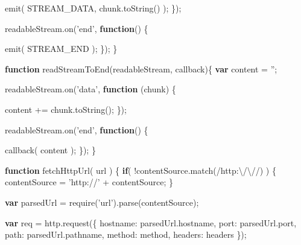 \documentclass[12pt, ]{article}
\newenvironment{Shaded}{}{}
\newcommand{\KeywordTok}[1]{\textcolor[rgb]{0.00,0.44,0.13}{\textbf{{#1}}}}
\newcommand{\DataTypeTok}[1]{\textcolor[rgb]{0.56,0.13,0.00}{{#1}}}
\newcommand{\FloatTok}[1]{\textcolor[rgb]{0.25,0.63,0.44}{{#1}}}
\newcommand{\StringTok}[1]{\textcolor[rgb]{0.25,0.44,0.63}{{#1}}}
\newcommand{\OtherTok}[1]{\textcolor[rgb]{0.00,0.44,0.13}{{#1}}}
\newcommand{\FunctionTok}[1]{\textcolor[rgb]{0.02,0.16,0.49}{{#1}}}
\newcommand{\NormalTok}[1]{{#1}}
\begin{document}
\begin{Shaded}
\begin{Highlighting}[]
         \FunctionTok{emit}\NormalTok{( STREAM_DATA, }\OtherTok{chunk}\NormalTok{.}\FunctionTok{toString}\NormalTok{() );}
      \NormalTok{\});}
      
      \OtherTok{readableStream}\NormalTok{.}\FunctionTok{on}\NormalTok{(}\StringTok{'end'}\NormalTok{, }\KeywordTok{function}\NormalTok{() \{}
               
         \FunctionTok{emit}\NormalTok{( STREAM_END );}
      \NormalTok{\});}
   \NormalTok{\}}
   
   \KeywordTok{function} \FunctionTok{readStreamToEnd}\NormalTok{(readableStream, callback)\{}
      \KeywordTok{var} \NormalTok{content = }\StringTok{''}\NormalTok{;}
   
      \OtherTok{readableStream}\NormalTok{.}\FunctionTok{on}\NormalTok{(}\StringTok{'data'}\NormalTok{, }\KeywordTok{function} \NormalTok{(chunk) \{}
                                             
         \NormalTok{content += }\OtherTok{chunk}\NormalTok{.}\FunctionTok{toString}\NormalTok{();}
      \NormalTok{\});}
      
      \OtherTok{readableStream}\NormalTok{.}\FunctionTok{on}\NormalTok{(}\StringTok{'end'}\NormalTok{, }\KeywordTok{function}\NormalTok{() \{}
               
         \FunctionTok{callback}\NormalTok{( content );}
      \NormalTok{\});}
   \NormalTok{\}}
   
   \KeywordTok{function} \FunctionTok{fetchHttpUrl}\NormalTok{( url ) \{}
      \KeywordTok{if}\NormalTok{( !}\OtherTok{contentSource}\NormalTok{.}\FunctionTok{match}\NormalTok{(}\OtherTok{/http:}\FloatTok{\textbackslash{}/\textbackslash{}/}\OtherTok{/}\NormalTok{) ) \{}
         \NormalTok{contentSource = }\StringTok{'http://'} \NormalTok{+ contentSource;}
      \NormalTok{\}                           }
                           
      \KeywordTok{var} \NormalTok{parsedUrl = }\FunctionTok{require}\NormalTok{(}\StringTok{'url'}\NormalTok{).}\FunctionTok{parse}\NormalTok{(contentSource); }
   
      \KeywordTok{var} \NormalTok{req = }\OtherTok{http}\NormalTok{.}\FunctionTok{request}\NormalTok{(\{}
         \DataTypeTok{hostname}\NormalTok{: }\OtherTok{parsedUrl}\NormalTok{.}\FunctionTok{hostname}\NormalTok{,}
         \DataTypeTok{port}\NormalTok{: }\OtherTok{parsedUrl}\NormalTok{.}\FunctionTok{port}\NormalTok{, }
         \DataTypeTok{path}\NormalTok{: }\OtherTok{parsedUrl}\NormalTok{.}\FunctionTok{pathname}\NormalTok{,}
         \DataTypeTok{method}\NormalTok{: method,}
         \DataTypeTok{headers}\NormalTok{: headers }
      \NormalTok{\});}
      

\end{Highlighting}
\end{Shaded}
\end{document}
